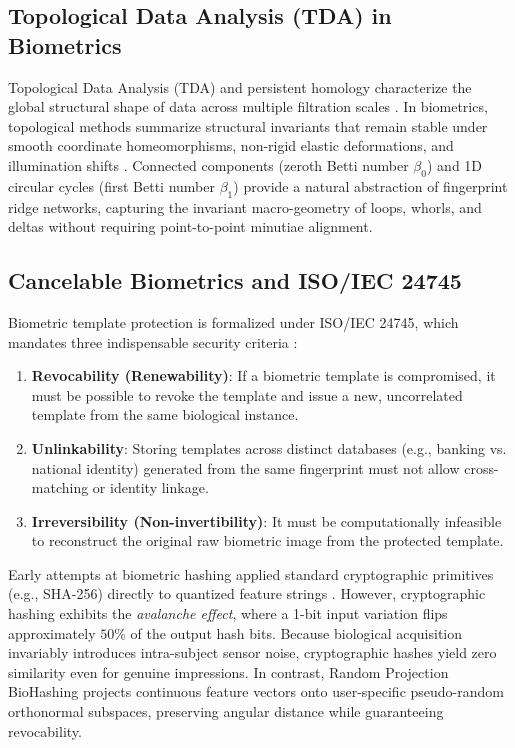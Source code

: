 \documentclass[lettersize,journal]{IEEEtran}
\begin{document}
\subsection{Topological Data Analysis (TDA) in Biometrics}
Topological Data Analysis (TDA) and persistent homology characterize the global structural shape of data across multiple filtration scales \cite{b32, b37}. In biometrics, topological methods summarize structural invariants that remain stable under smooth coordinate homeomorphisms, non-rigid elastic deformations, and illumination shifts \cite{b37}. Connected components (zeroth Betti number $\beta_0$) and 1D circular cycles (first Betti number $\beta_1$) provide a natural abstraction of fingerprint ridge networks, capturing the invariant macro-geometry of loops, whorls, and deltas without requiring point-to-point minutiae alignment.

\subsection{Cancelable Biometrics and ISO/IEC 24745}
Biometric template protection is formalized under ISO/IEC 24745, which mandates three indispensable security criteria \cite{b39, b43}:
\begin{enumerate}
    \item \textbf{Revocability (Renewability)}: If a biometric template is compromised, it must be possible to revoke the template and issue a new, uncorrelated template from the same biological instance.
    \item \textbf{Unlinkability}: Storing templates across distinct databases (e.g., banking vs. national identity) generated from the same fingerprint must not allow cross-matching or identity linkage.
    \item \textbf{Irreversibility (Non-invertibility)}: It must be computationally infeasible to reconstruct the original raw biometric image from the protected template.
\end{enumerate}
Early attempts at biometric hashing applied standard cryptographic primitives (e.g., SHA-256) directly to quantized feature strings \cite{b43}. However, cryptographic hashing exhibits the \textit{avalanche effect}, where a 1-bit input variation flips approximately $50\%$ of the output hash bits. Because biological acquisition invariably introduces intra-subject sensor noise, cryptographic hashes yield zero similarity even for genuine impressions. In contrast, Random Projection BioHashing \cite{b43} projects continuous feature vectors onto user-specific pseudo-random orthonormal subspaces, preserving angular distance while guaranteeing revocability.
\end{document}
